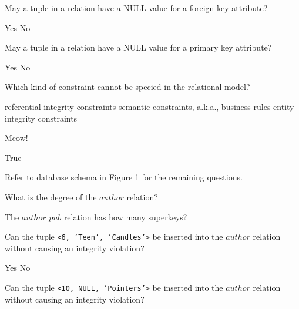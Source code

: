 \documentclass[answers,10pt,a4paper]{exam}
\begin{document}
\begin{questions}
\begin{choices}
\end{choices}

\question[4] May a tuple in a relation have a NULL value for a foreign key attribute?

\begin{choices}
\correctchoice Yes
\choice No
\end{choices}

\question[4] May a tuple in a relation have a NULL value for a primary key attribute?

\begin{choices}
\choice Yes
\correctchoice No
\end{choices}

\question[4] Which kind of constraint cannot be specied in the relational model?

\begin{choices}
\choice referential integrity constraints
\correctchoice semantic constraints, a.k.a., business rules
\choice entity integrity constraints
\end{choices}

\question[4] Meow!

\begin{choices}
\correctchoice True
\end{choices}


\newpage

Refer to database schema in Figure 1 for the remaining questions.

\question[4] What is the degree of the $author$ relation?

\begin{choices}
\end{choices}

\question[4] The $author\_pub$ relation has how many superkeys?

\begin{choices}
\end{choices}

\question[4] Can the tuple {\tt <6, 'Teen', 'Candles'>} be inserted into the $author$ relation without causing an integrity violation?

\begin{choices}
\choice Yes
\correctchoice No
\end{choices}

\question[4] Can the tuple {\tt <10, NULL, 'Pointers'>} be inserted into the $author$ relation without causing an integrity violation?


\end{questions}
\end{document}
